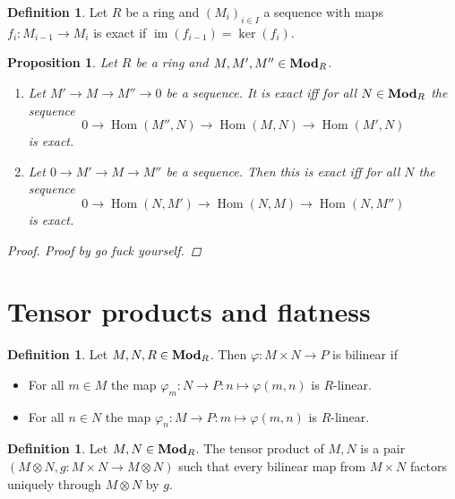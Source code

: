 \documentclass{article}
\DeclareMathOperator{\im}{im}
\DeclareMathOperator{\Hom}{Hom}
\DeclareMathOperator{\modules}{{\bf Mod}}
\newtheorem{proposition}[theorem]{Proposition}
\theoremstyle{definition}
\newtheorem{definition}[theorem]{Definition}
\begin{document}
\begin{definition}
    Let \(R\) be a ring and \((M_{i})_{i\in I}\) a sequence with maps
    \(f_{i}:M_{i-1}\to M_{i}\) is exact if \(\im(f_{i-1})=\ker(f_{i})\).
\end{definition}

\begin{proposition}
    Let \(R\) be a ring and \(M,M',M''\in\modules_{R}\).

    \begin{enumerate}
        \item Let \(M'\to M\to M''\to 0\) be a sequence. It is exact iff for all
              \(N\in\modules_{R}\) the sequence
              \[
                  0\to\Hom(M'',N)\to\Hom(M,N)\to\Hom(M',N)
              \]
              is exact.

        \item Let \(0\to M'\to M\to M''\) be a sequence. Then this is exact iff
              for all \(N\) the sequence
              \[
                  0\to\Hom(N,M')\to\Hom(N,M)\to\Hom(N,M'')
              \]
              is exact.
    \end{enumerate}

    \begin{proof}
        Proof by go fuck yourself.
    \end{proof}
\end{proposition}

\section{Tensor products and flatness}
\begin{definition}
    Let \(M,N,R\in\modules_{R}\). Then \(\varphi:M\times N\to P\) is bilinear
    if
    \begin{itemize}
        \item For all \(m\in M\) the map \(\varphi_{m}:N\to
              P:n\mapsto\varphi(m,n)\) is \(R\)-linear.
        \item For all \(n\in N\) the map \(\varphi_{n}:M\to
              P:m\mapsto\varphi(m,n)\) is \(R\)-linear.
    \end{itemize}
\end{definition}

\begin{definition}
    Let \(M,N\in\modules_{R}\). The tensor product of \(M,N\) is a pair
    \((M\otimes N,g:M\times N\to M\otimes N)\) such that every bilinear map from
    \(M\times N\) factors uniquely through \(M\otimes N\) by \(g\).
\end{definition}
\end{document}

